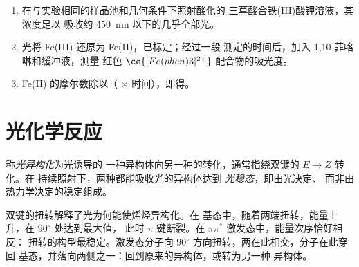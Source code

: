 \begin{method}[草酸铁光量测定法]\label{met:b3:photochemistry:actinometry}
\begin{enumerate}
  \item 在与实验相同的样品池和几何条件下照射酸化的
        三草酸合铁(III)酸钾溶液，其浓度足以
        吸收约 \qty{450}{nm} 以下的几乎全部光。
  \item 光将 Fe(III) 还原为 Fe(II)，已标定；经过一段
        测定的时间后，加入 1,10-菲咯啉和缓冲液，测量
        红色 $\ce{[Fe(phen)3]^{2+}}$ 配合物的吸光度。
  \item Fe(II) 的摩尔数除以（ $\times$ 时间），即得。
\end{enumerate}
\end{method}

\section{光化学反应}

\begin{definition}\label{def:b3:photochemistry:photoisomerisation}
称\emph{光异构化}为光诱导的
一种异构体向另一种的转化，通常指绕双键的 $E \to Z$ 转化。在
持续照射下，两种都能吸收光的异构体达到
\emph{光稳态}，即由光决定、
而非由热力学决定的稳定组成。
\end{definition}

双键的扭转解释了光为何能使烯烃异构化。在
基态中，随着两端扭转，能量上升，在 $90^\circ$ 处达到最大值，
此时 $\pi$ 键断裂。在 $\pi\pi^*$ 激发态中，能量次序恰好相反：
扭转的构型最稳定。激发态分子向
$90^\circ$ 方向扭转，两在此相交，分子在此穿回
基态，并落向两侧之一：回到原来的异构体，或转为另一种
异构体。

